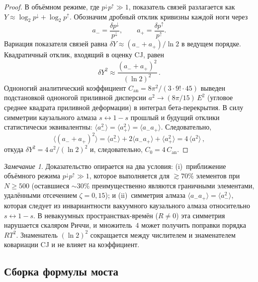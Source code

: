 \documentclass[12pt,a4paper]{article}
\theoremstyle{plain}
\theoremstyle{definition}
\theoremstyle{remark}
\newtheorem{remark}[theorem]{Замечание}
\begin{document}
\begin{proof}
В объёмном режиме, где
$p^{\downarrow} p^{\uparrow} \gg 1$, показатель связей
разлагается как
$Y \approx \log_2 p^{\downarrow} + \log_2 p^{\uparrow}$.
Обозначим дробный отклик кривизны каждой ноги через
\begin{equation}
  a_- = \frac{\delta p^{\downarrow}}{p^{\downarrow}},
  \qquad
  a_+ = \frac{\delta p^{\uparrow}}{p^{\uparrow}}.
\end{equation}
Вариация показателя связей равна
$\delta Y \approx (a_- + a_+)/\ln 2$ в ведущем порядке.
Квадратичный отклик, входящий в оценку CJ, равен
\begin{equation}\label{eq:dY2-twoleg}
  \delta Y^2 \approx \frac{(a_- + a_+)^2}{(\ln 2)^2}\,.
\end{equation}
Одноногий аналитический коэффициент $C_{\mathrm{an}} = 8\pi^2/
(3 \cdot 9! \cdot 45)$ выведен подстановкой одноногой
приливной дисперсии $a^2 \to (8\pi/15)\, E^2$ (угловое
среднее квадрата приливной деформации) в интеграл
бета-перекрытия.  В силу симметрии каузального алмаза
$s \leftrightarrow 1-s$ прошлый и будущий отклики
статистически эквивалентны:
$\langle a_-^2 \rangle = \langle a_+^2 \rangle = \langle a_- a_+ \rangle$.  Следовательно,
\begin{equation}
  \langle (a_- + a_+)^2 \rangle
  = \langle a_-^2 \rangle + 2\langle a_- a_+ \rangle + \langle a_+^2 \rangle
  = 4\, \langle a^2 \rangle\,,
\end{equation}
откуда $\delta Y^2 = 4\, a^2/(\ln 2)^2$ и, следовательно,
$C_0 = 4\, C_{\mathrm{an}}$.
\end{proof}

\begin{remark}
Доказательство опирается на два условия: (i)~приближение
объёмного режима
$p^{\downarrow} p^{\uparrow} \gg 1$, которое выполняется
для $\gtrsim 70\%$ элементов при $N \geq 500$ (оставшиеся
$\sim 30\%$ преимущественно являются граничными элементами,
удалёнными отсечением $\zeta = 0{,}15$); и (ii)~симметрия
алмаза
$\langle a_- a_+ \rangle = \langle a_-^2 \rangle$, которая
следует из инвариантности вакуумного каузального алмаза
относительно $s \leftrightarrow 1-s$.  В невакуумных
пространствах-времён ($R \neq 0$) эта симметрия нарушается
скаляром Риччи, и множитель~$4$ может получить поправки
порядка $R T^2$.  Знаменатель $(\ln 2)^2$ сокращается между
числителем и знаменателем ковариации CJ и не влияет на
коэффициент.
\end{remark}

\subsection{Сборка формулы моста}
\label{sec:assembly}
\end{document}
